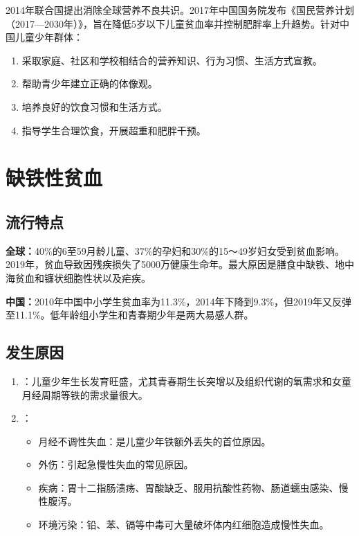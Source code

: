 \begin{keybox}
2014年联合国提出消除全球营养不良共识。2017年中国国务院发布《国民营养计划（2017—2030年）》，旨在降低5岁以下儿童贫血率并控制肥胖率上升趋势。针对中国儿童少年群体：
\begin{enumerate}[leftmargin=*]
    \item 采取家庭、社区和学校相结合的营养知识、行为习惯、生活方式宣教。
    \item 帮助青少年建立正确的体像观。
    \item 培养良好的饮食习惯和生活方式。
    \item 指导学生合理饮食，开展超重和肥胖干预。
\end{enumerate}
\end{keybox}

\section{缺铁性贫血}

\subsection{流行特点}

\begin{keybox}
\textbf{全球：}40\%的6至59月龄儿童、37\%的孕妇和30\%的15～49岁妇女受到贫血影响。2019年，贫血导致因残疾损失了5000万健康生命年。最大原因是膳食中缺铁、地中海贫血和镰状细胞性状以及疟疾。

\textbf{中国：}2010年中国中小学生贫血率为11.3\%，2014年下降到9.3\%，但2019年又反弹至11.1\%。低年龄组小学生和青春期少年是两大易感人群。
\end{keybox}

\subsection{发生原因}

\begin{keybox}
\begin{enumerate}[leftmargin=*]
    \item {}：儿童少年生长发育旺盛，尤其青春期生长突增以及组织代谢的氧需求和女童月经周期等铁的需求量很大。
    \item {}：
    \begin{itemize}
        \item 月经不调性失血：是儿童少年铁额外丢失的首位原因。
        \item 外伤：引起急慢性失血的常见原因。
        \item 疾病：胃十二指肠溃疡、胃酸缺乏、服用抗酸性药物、肠道蠕虫感染、慢性腹泻。
        \item 环境污染：铅、苯、镉等中毒可大量破坏体内红细胞造成慢性失血。
    \end{itemize}
\end{enumerate}
\end{keybox}

